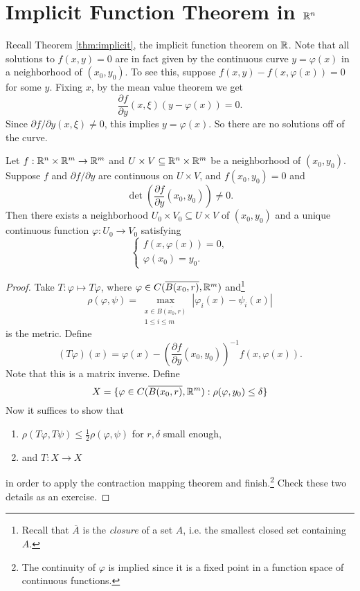 \section{Implicit Function Theorem in \texorpdfstring{$\mathbb{R}^n$}{Rn}}

\begin{remark}
  Recall Theorem \ref{thm:implicit}, the implicit function
  theorem on $\mathbb{R}$. Note that all solutions to $f(x, y) = 0$
  are in fact given by the continuous curve $y = \varphi(x)$
  in a neighborhood of $(x_0, y_0)$. To see this,
  suppose $f(x, y) - f(x, \varphi(x)) = 0$ for some $y$.
  Fixing $x$, by the mean value theorem we get
  \[
    \frac{\partial f}{\partial y}(x, \xi) (y - \varphi(x))
    = 0.
  \]
  Since $\partial f / \partial y(x, \xi) \ne 0$, this implies $y = \varphi(x)$.
  So there are no solutions off of the curve.
\end{remark}

\begin{theorem}
  \label{thm:implicit-higher-dim}
  Let $f : \mathbb{R}^n \times \mathbb{R}^m \to \mathbb{R}^m$ and
  $U \times V \subseteq \mathbb{R}^n \times \mathbb{R}^m$ be a neighborhood
  of $(x_0, y_0)$. Suppose $f$ and $\partial f / \partial y$
  are continuous on $U \times V$, and $f(x_0, y_0) = 0$ and
  \[
    \det \left( \frac{\partial f}{\partial y}(x_0, y_0) \right) \ne 0.
  \]
  Then there exists a neighborhood $U_0 \times V_0 \subseteq U \times V$
  of $(x_0, y_0)$ and a unique continuous function
  $\varphi : U_0 \to V_0$ satisfying
  \[
  \begin{cases}
    f(x, \varphi(x)) = 0, \\
    \varphi(x_0) = y_0.
  \end{cases}
  \]
\end{theorem}

\begin{proof}
  Take $T : \varphi \mapsto T\varphi$, where
  $\varphi \in C(\overline{B(x_0, r)}, \mathbb{R}^m)$ and\footnote{Recall that $\overline{A}$ is the \emph{closure} of a set $A$, i.e. the smallest closed set containing $A$.}
  \[
    \rho(\varphi, \psi) = \max_{\substack{x \in \overline{B(x_0, r)} \\ 1 \le i \le m}} |\varphi_i(x) - \psi_i(x)|
  \]
  is the metric.
  Define
  \[
    (T\varphi)(x) = \varphi(x) - \left( \frac{\partial f}{\partial y}(x_0, y_0) \right)^{-1} f(x, \varphi(x)).
  \]
  Note that this is a matrix inverse.
  Define
  \[
    X = \{
      \varphi \in C(\overline{B(x_0, r)}, \mathbb{R}^m)
      : \rho(\varphi, y_0) \le \delta
    \}
  \]
  Now it suffices to show that
  \begin{enumerate}
    \item $\rho(T\varphi, T\psi) \le \frac{1}{2} \rho(\varphi, \psi)$ for $r, \delta$ small enough,
    \item and $T : X \to X$
  \end{enumerate}
  in order to apply the contraction mapping theorem and
  finish.\footnote{The continuity of $\varphi$ is implied since it is a fixed point in a function space of continuous functions.} Check these two details as an exercise.
\end{proof}

